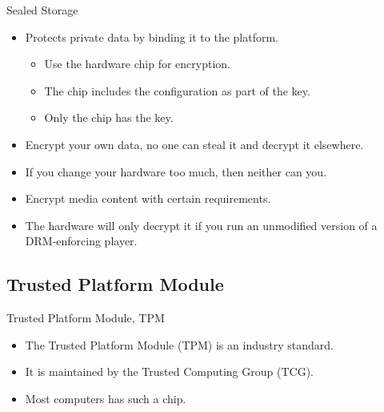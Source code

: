 \begin{frame}
  \begin{block}{Sealed Storage}
    \begin{itemize}
      \item Protects private data by binding it to the platform.
        \begin{itemize}
          \item Use the hardware chip for encryption.
          \item The chip includes the configuration as part of the key.
          \item Only the chip has the key.
        \end{itemize}
    \end{itemize}
  \end{block}
\end{frame}

\begin{frame}
  \begin{example}
    \begin{itemize}
      \item Encrypt your own data, no one can steal it and decrypt it 
        elsewhere.
      \item If you change your hardware too much, then neither can you.
    \end{itemize}
  \end{example}

  \pause{}

  \begin{example}
    \begin{itemize}
      \item Encrypt media content with certain requirements.
      \item The hardware will only decrypt it if you run an unmodified version 
        of a DRM-enforcing player.
    \end{itemize}
  \end{example}
\end{frame}

\subsection{Trusted Platform Module}

\begin{frame}
  \begin{block}{Trusted Platform Module, TPM}
    \begin{itemize}
      \item The Trusted Platform Module (TPM) is an industry standard.
      \item It is maintained by the Trusted Computing Group (TCG).
      \item Most computers has such a chip.
    \end{itemize}
  \end{block}
\end{frame}

